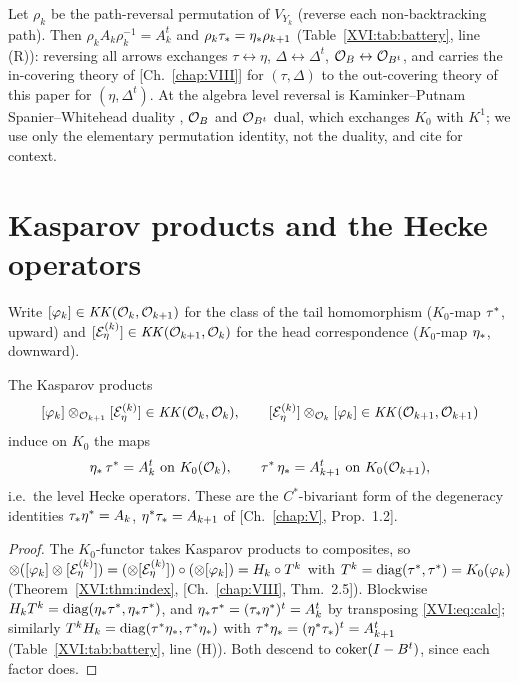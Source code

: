 \begin{remark}\label{XVI:rem:reversal}
Let $\rho_k$ be the path-reversal permutation of $V_{Y_k}$ (reverse each non-backtracking
path). Then $\rho_kA_k\rho_k^{-1}=A_k^{t}$ and $\rho_k\tau_*=\eta_*\rho_{k+1}$
(Table~\ref{XVI:tab:battery}, line (R)): reversing all arrows exchanges $\tau\leftrightarrow\eta$,
$\Delta\leftrightarrow\Delta^{t}$, $\mathcal{O}_{B}\leftrightarrow\mathcal{O}_{B^{t}}$, and carries the
in-covering theory of [Ch.~\ref{chap:VIII}] for $(\tau,\Delta)$ to the out-covering theory of this paper
for $(\eta,\Delta^{t})$. At the algebra level reversal is Kaminker--Putnam
Spanier--Whitehead duality \cite{KP}, $\mathcal{O}_{B}$ and $\mathcal{O}_{B^{t}}$ dual, which exchanges
$K_0$ with $K^{1}$; we use only the elementary permutation identity, not the duality, and
cite \cite{KP} for context.
\end{remark}

\section{Kasparov products and the Hecke operators}\label{XVI:sec:products}

Write $[\varphi_k]\in\mathit{KK}(\mathcal{O}_k,\mathcal{O}_{k+1})$ for the class of the tail homomorphism
($K_0$-map $\tau^*$, upward) and $[\mathcal{E}_\eta^{(k)}]\in\mathit{KK}(\mathcal{O}_{k+1},\mathcal{O}_k)$ for the head
correspondence ($K_0$-map $\eta_*$, downward).

\begin{theorem}\label{XVI:thm:hecke}
The Kasparov products
\[
[\varphi_k]\otimes_{\mathcal{O}_{k+1}}[\mathcal{E}_\eta^{(k)}]\in\mathit{KK}(\mathcal{O}_k,\mathcal{O}_k),\qquad
[\mathcal{E}_\eta^{(k)}]\otimes_{\mathcal{O}_k}[\varphi_k]\in\mathit{KK}(\mathcal{O}_{k+1},\mathcal{O}_{k+1})
\]
induce on $K_0$ the maps
\[
\et\,\taup=A_k^{t}\ \text{on}\ K_0(\cO_k),\qquad
\taup\,\et=A_{k+1}^{t}\ \text{on}\ K_0(\cO_{k+1}),
\]
i.e.\ the level Hecke operators. These are the $C^*$-bivariant form of the degeneracy
identities $\tau_*\eta^*=A_k$, $\eta^*\tau_*=A_{k+1}$ of {\rm[Ch.~\ref{chap:V}, Prop.~1.2]}.
\end{theorem}

\begin{proof}
The $K_0$-functor takes Kasparov products to composites, so
$\otimes([\varphi_k]\otimes[\mathcal{E}_\eta^{(k)}])=(\otimes[\mathcal{E}_\eta^{(k)}])\circ(\otimes[\varphi_k])
=H_k\circ T^{k}$ with $T^{k}=\operatorname{diag}(\tau^*,\tau^*)=K_0(\varphi_k)$
(Theorem~\ref{XVI:thm:index}, [Ch.~\ref{chap:VIII}, Thm.~2.5]). Blockwise
$H_kT^{k}=\operatorname{diag}(\eta_*\tau^*,\eta_*\tau^*)$, and $\eta_*\tau^*=(\tau_*\eta^*)^{t}=A_k^{t}$ by
transposing \eqref{XVI:eq:calc}; similarly $T^{k}H_k=\operatorname{diag}(\tau^*\eta_*,\tau^*\eta_*)$ with
$\tau^*\eta_*=(\eta^*\tau_*)^{t}=A_{k+1}^{t}$ (Table~\ref{XVI:tab:battery}, line (H)). Both descend to
$\operatorname{coker}(I-B^{t})$, since each factor does.
\end{proof}

